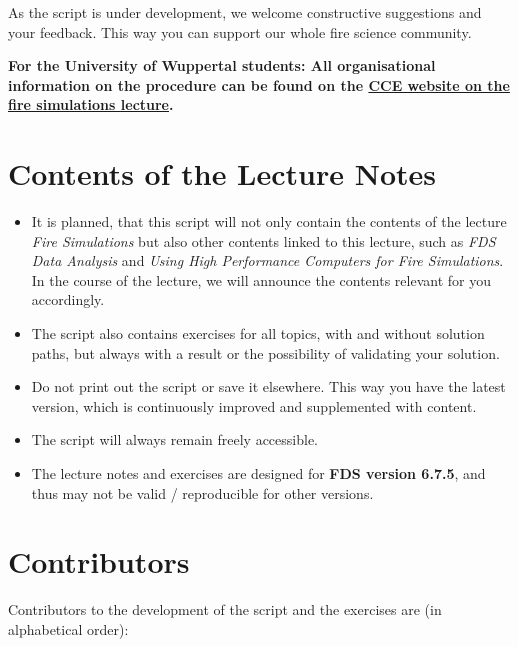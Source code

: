 \documentclass[
  letterpaper,
  DIV=11,
  numbers=noendperiod]{scrreprt}
\providecommand{\tightlist}{%
  \setlength{\itemsep}{0pt}\setlength{\parskip}{0pt}}\usepackage{longtable,booktabs,array}
\begin{document}
As the script is under development, we welcome constructive suggestions
and your feedback. This way you can support our whole fire science
community.

\textbf{For the University of Wuppertal students: All organisational
information on the procedure can be found on the
\href{https://cce.uni-wuppertal.de/de/lehre/numerische-brandsimulationen.html}{CCE
website on the fire simulations lecture}.}

\section*{Contents of the Lecture
Notes}\label{contents-of-the-lecture-notes}


\begin{itemize}
\tightlist
\item
  It is planned, that this script will not only contain the contents of
  the lecture \emph{Fire Simulations} but also other contents linked to
  this lecture, such as \emph{FDS Data Analysis} and \emph{Using High
  Performance Computers for Fire Simulations}. In the course of the
  lecture, we will announce the contents relevant for you accordingly.
\item
  The script also contains exercises for all topics, with and without
  solution paths, but always with a result or the possibility of
  validating your solution.
\item
  Do not print out the script or save it elsewhere. This way you have
  the latest version, which is continuously improved and supplemented
  with content.
\item
  The script will always remain freely accessible.
\item
  The lecture notes and exercises are designed for \textbf{FDS version
  6.7.5}, and thus may not be valid / reproducible for other versions.
\end{itemize}

\section*{Contributors}\label{contributors}


Contributors to the development of the script and the exercises are (in
alphabetical order):
\end{document}
